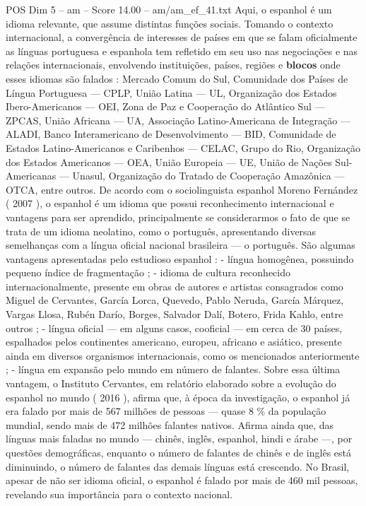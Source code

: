 \begin{textsample}{POS Dim 5 – am – Score 14.00 – am/am\_ef\_41.txt}
Aqui, o espanhol é um idioma relevante, que assume distintas funções sociais.
Tomando o contexto internacional, a convergência de interesses de países em que se falam oficialmente as línguas portuguesa e espanhola tem refletido em seu uso nas negociações e nas relações internacionais, envolvendo instituições, países, regiões e \textbf{blocos} onde esses idiomas são falados : Mercado Comum do Sul, Comunidade dos Países de Língua Portuguesa — CPLP, União Latina — UL, Organização dos Estados Ibero-Americanos — OEI, Zona de Paz e Cooperação do Atlântico Sul — ZPCAS, União Africana — UA, Associação Latino-Americana de Integração — ALADI, Banco Interamericano de Desenvolvimento — BID, Comunidade de Estados Latino-Americanos e Caribenhos — CELAC, Grupo do Rio, Organização dos Estados Americanos — OEA, União Europeia — UE, União de Nações Sul-Americanas — Unasul, Organização do Tratado de Cooperação Amazônica — OTCA, entre outros.
De acordo com o sociolinguista espanhol Moreno Fernández ( 2007 ), o espanhol é um idioma que possui reconhecimento internacional e vantagens para ser aprendido, principalmente se considerarmos o fato de que se trata de um idioma neolatino, como o português, apresentando diversas semelhanças com a língua oficial nacional brasileira — o português.
São algumas vantagens apresentadas pelo estudioso espanhol : - língua homogênea, possuindo pequeno índice de fragmentação ; - idioma de cultura reconhecido internacionalmente, presente em obras de autores e artistas consagrados como Miguel de Cervantes, García Lorca, Quevedo, Pablo Neruda, García Márquez, Vargas Llosa, Rubén Darío, Borges, Salvador Dalí, Botero, Frida Kahlo, entre outros ; - língua oficial — em alguns casos, cooficial — em cerca de 30 países, espalhados pelos continentes americano, europeu, africano e asiático, presente ainda em diversos organismos internacionais, como os mencionados anteriormente ; - língua em expansão pelo mundo em número de falantes.
Sobre essa última vantagem, o Instituto Cervantes, em relatório elaborado sobre a evolução do espanhol no mundo ( 2016 ), afirma que, à época da investigação, o espanhol já era falado por mais de 567 milhões de pessoas — quase 8 \% da população mundial, sendo mais de 472 milhões falantes nativos.
Afirma ainda que, das línguas mais faladas no mundo — chinês, inglês, espanhol, hindi e árabe —, por questões demográficas, enquanto o número de falantes de chinês e de inglês está diminuindo, o número de falantes das demais línguas está crescendo.
No Brasil, apesar de não ser idioma oficial, o espanhol é falado por mais de 460 mil pessoas, revelando sua importância para o contexto nacional.

\end{textsample}
